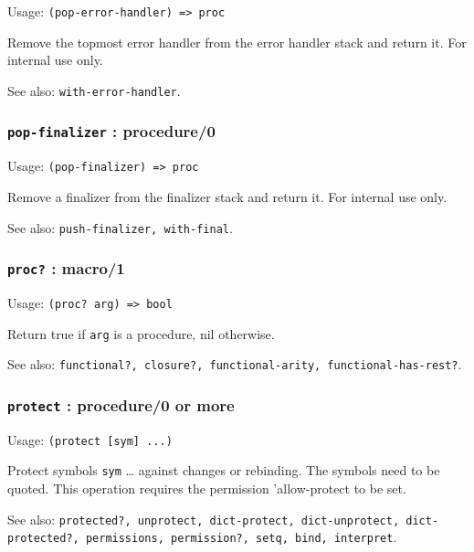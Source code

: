 \documentclass[
]{article}
\newcommand{\passthrough}[1]{#1}
\begin{document}
Usage: \passthrough{\lstinline!(pop-error-handler) => proc!}

Remove the topmost error handler from the error handler stack and return
it. For internal use only.

See also: \passthrough{\lstinline!with-error-handler!}.

\hypertarget{pop-finalizer-procedure0}{%
\subsubsection{\texorpdfstring{\texttt{pop-finalizer} :
procedure/0}{pop-finalizer : procedure/0}}\label{pop-finalizer-procedure0}}

Usage: \passthrough{\lstinline!(pop-finalizer) => proc!}

Remove a finalizer from the finalizer stack and return it. For internal
use only.

See also: \passthrough{\lstinline!push-finalizer, with-final!}.

\hypertarget{proc-macro1}{%
\subsubsection{\texorpdfstring{\texttt{proc?} :
macro/1}{proc? : macro/1}}\label{proc-macro1}}

Usage: \passthrough{\lstinline!(proc? arg) => bool!}

Return true if \passthrough{\lstinline!arg!} is a procedure, nil
otherwise.

See also:
\passthrough{\lstinline!functional?, closure?, functional-arity, functional-has-rest?!}.

\hypertarget{protect-procedure0-or-more}{%
\subsubsection{\texorpdfstring{\texttt{protect} : procedure/0 or
more}{protect : procedure/0 or more}}\label{protect-procedure0-or-more}}

Usage: \passthrough{\lstinline!(protect [sym] ...)!}

Protect symbols \passthrough{\lstinline!sym!} \ldots{} against changes
or rebinding. The symbols need to be quoted. This operation requires the
permission 'allow-protect to be set.

See also:
\passthrough{\lstinline!protected?, unprotect, dict-protect, dict-unprotect, dict-protected?, permissions, permission?, setq, bind, interpret!}.
\end{document}
